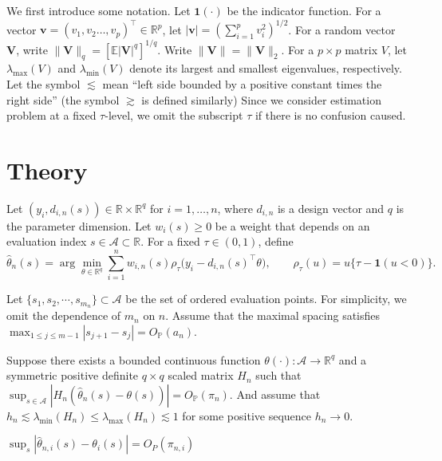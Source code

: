 \documentclass[lineno]{biometrika}
\begin{document}
We first introduce some notation. Let $\mathbf{1}(\cdot)$ be the indicator function. For a vector $\mathbf{v}=(v_1,v_2\ldots,v_p)^\top\in\mathbb{R}^p$, let $|\mathbf{v}|=(\sum_{i=1}^pv_i^2)^{1/2}$. For a random vector $\mathbf{V}$, write $\|\mathbf{V}\|_q=[\mathbb{E}|\mathbf{V}|^q]^{1/q}$. Write $\|\mathbf{V}\|=\|\mathbf{V}\|_2$. For a $p\times p$ matrix $V$, let $\lambda_{\max}(V)$ and $\lambda_{\min}(V)$ denote its largest and smallest eigenvalues, respectively. Let the symbol $\lesssim$ mean “left side bounded by a
positive constant times the right side” (the symbol $\gtrsim$ is defined similarly) Since we consider estimation problem at a fixed $\tau$-level, we omit the subscript $\tau$ if there is no confusion caused.

\section{Theory}

Let $(y_i,d_{i,n}(s))\in\mathbb R\times\mathbb R^q$ for $i=1,\ldots,n$, where $d_{i,n}$ is a design vector and
$q$ is the parameter dimension. Let $w_i(s)\ge 0$ be a weight that depends on an evaluation index $s\in \mathcal{A}\subset \mathbb{R}$. For a fixed
$\tau\in(0,1)$, define
\begin{equation}
\hat\theta_n(s)=\arg\min_{\theta\in\mathbb R^q}\sum_{i=1}^n w_{i,n}(s) \rho_\tau \bigl(y_i-d_{i,n}(s)^\top\theta\bigr),
\qquad
\rho_\tau(u)=u\{\tau-\mathbf 1(u<0)\}.
\label{eq:weighted-qr}
\end{equation}


\begin{assumption}
Let $\{s_1,s_2,\cdots, s_{m_n}\}\subset \mathcal{A}$ be the set of ordered evaluation points. For simplicity, we omit the dependence of $m_n$ on $n$. Assume that the maximal spacing satisfies $\max_{1 \le j \le m-1} |s_{j+1} - s_j| = O_{\mathbb{P}}(a_n)$.
\end{assumption}

\begin{assumption} 
    Suppose there exists a bounded continuous function $\theta(\cdot):\mathcal{A}\to\mathbb{R}^q$ and a symmetric positive definite $q\times q$ scaled matrix $H_n$ such that $\sup_{s\in\mathcal{A}}|H_n(\hat{\theta}_n(s)-\theta(s))|=O_{\mathbb{P}}(\pi_n)$. And assume that ${h}_n \lesssim \lambda_{\min}(H_n)\le\lambda_{\max}(H_n)\lesssim  1$ for some positive sequence ${h}_n\to 0$.

    $\sup_s|\hat\theta_{n,i}(s)-\theta_i(s)|=O_P(\pi_{n,i})$
\end{assumption}
\end{document}
